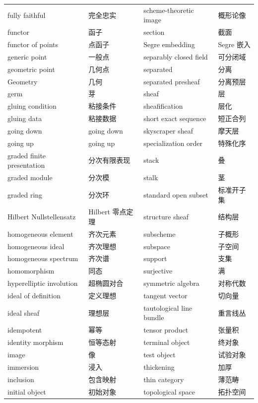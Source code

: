 \begin{longtable}{@{}>{\raggedright\arraybackslash}p{}>{\raggedright\arraybackslash}p{}>{\raggedright\arraybackslash}p{}>{\raggedright\arraybackslash}p{}@{}}
fully faithful & 完全忠实 & scheme-theoretic image & 概形论像 \\
functor & 函子 & section & 截面 \\
functor of points & 点函子 & Segre embedding & Segre 嵌入 \\
generic point & 一般点 & separably closed field & 可分闭域 \\
geometric point & 几何点 & separated & 分离 \\
Geometry & 几何 & separated presheaf & 分离预层 \\
germ & 芽 & sheaf & 层 \\
gluing condition & 粘接条件 & sheafification & 层化 \\
gluing data & 粘接数据 & short exact sequence & 短正合列 \\
going down & going down & skyscraper sheaf & 摩天层 \\
going up & going up & specialization order & 特殊化序 \\
graded finite presentation & 分次有限表现 & stack & 叠 \\
graded module & 分次模 & stalk & 茎 \\
graded ring & 分次环 & standard open subset & 标准开子集 \\
Hilbert Nullstellensatz & Hilbert 零点定理 & structure sheaf & 结构层 \\
homogeneous element & 齐次元素 & subscheme & 子概形 \\
homogeneous ideal & 齐次理想 & subspace & 子空间 \\
homogeneous spectrum & 齐次谱 & support & 支集 \\
homomorphism & 同态 & surjective & 满 \\
hyperelliptic involution & 超椭圆对合 & symmetric algebra & 对称代数 \\
ideal of definition & 定义理想 & tangent vector & 切向量 \\
ideal sheaf & 理想层 & tautological line bundle & 重言线丛 \\
idempotent & 幂等 & tensor product & 张量积 \\
identity morphism & 恒等态射 & terminal object & 终对象 \\
image & 像 & test object & 试验对象 \\
immersion & 浸入 & thickening & 加厚 \\
inclusion & 包含映射 & thin category & 薄范畴 \\
initial object & 初始对象 & topological space & 拓扑空间 \\

\end{longtable}
